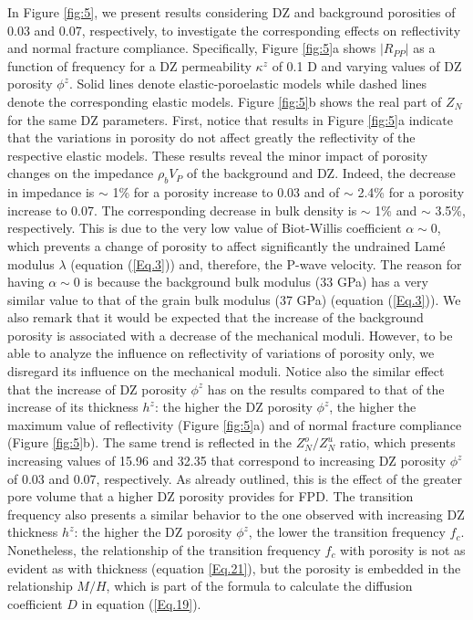 \documentclass[draft]{agujournal2019}
\begin{document}
In Figure \ref{fig:5}, we present results considering  DZ and background porosities of 0.03 and 0.07, respectively, to investigate the corresponding effects on reflectivity and normal fracture compliance. Specifically, Figure \ref{fig:5}a shows $|R_{PP}|$ as a function of frequency for a DZ permeability $ \kappa^z $ of 0.1 D and varying values of DZ porosity $\phi^z$. 
Solid lines denote elastic-poroelastic models while dashed lines denote the corresponding elastic models.
Figure \ref{fig:5}b shows the real part of $Z_N$ for the same DZ parameters.
First, notice that  results in Figure \ref{fig:5}a indicate that the variations in porosity do not affect greatly the reflectivity of the respective elastic models. 
These results reveal the minor impact of porosity changes on the impedance $\rho_b V_P$ of the background and DZ.
Indeed, the decrease in impedance is $\sim$ 1\% for a porosity increase to 0.03 and of $\sim$ 2.4\% for a porosity increase to 0.07. The corresponding decrease in bulk density is $\sim$ 1\%  and $\sim$ 3.5\%, respectively.
This is due to the very low value of Biot-Willis coefficient $\alpha \sim 0$, which prevents a change of porosity to affect significantly the undrained Lamé modulus $\lambda$ (equation (\ref{Eq.3})) and, therefore, the  P-wave velocity.
The reason for having  $\alpha \sim 0$ is because the background bulk modulus (33 GPa) has a very similar value to that of the grain bulk modulus (37 GPa) (equation (\ref{Eq.3})). 
We also remark that it would be expected that the increase of the background porosity is associated with a decrease of the mechanical moduli. However, to be able to analyze the influence on reflectivity of variations of porosity only, we disregard its influence on the mechanical moduli.
Notice also the similar effect that the increase of DZ porosity $\phi^z$ has on the results compared to that of the increase of its thickness $h^z$: the higher the DZ porosity $\phi^z$, the higher the maximum value of reflectivity (Figure \ref{fig:5}a) and of normal fracture compliance (Figure \ref{fig:5}b). The same trend is reflected in the $Z_N^o/Z_N^u$ ratio, which presents increasing values of 15.96 and  32.35  that correspond to increasing DZ porosity $\phi^z$ of 0.03 and 0.07, respectively. As already outlined, this is the effect of the greater pore volume that a higher DZ porosity provides for FPD.
The transition frequency also presents a similar behavior to the one observed with increasing DZ thickness $h^z$: the higher the DZ porosity $\phi^z$, the lower the transition frequency $f_c$. Nonetheless, the relationship of the transition frequency $f_c$ with porosity is not as evident as with thickness (equation \ref{Eq.21}), but the porosity is embedded in the relationship $M/H$, which is part of the formula to calculate the diffusion coefficient $D$ in equation (\ref{Eq.19}).
\end{document}

